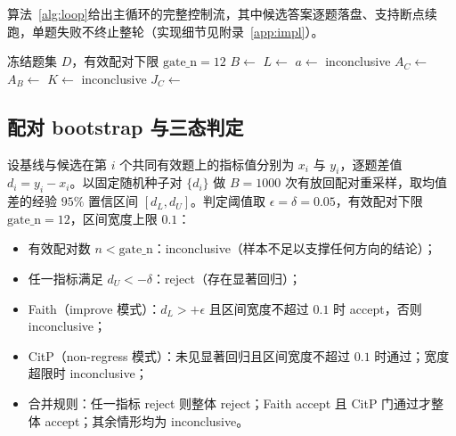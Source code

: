 \documentclass[11pt,a4paper,fontset=fandol]{ctexart}
\begin{document}
算法~\ref{alg:loop}给出主循环的完整控制流，其中候选答案逐题落盘、支持断点续跑，单题失败不终止整轮（实现细节见附录~\ref{app:impl}）。

\begin{algorithm}[H]
\caption{单管线三态比较主循环}\label{alg:loop}
\begin{algorithmic}[1]
\Require 冻结题集 $D$，有效配对下限 $\mathrm{gate\_n}=12$
\State $B\gets$ 
\State $L\gets$ 
\State $a\gets$ 
  \State \Return inconclusive 
\EndIf
\State $A_C\gets$ 
\State $A_B\gets$
\State $K\gets$
  \State \Return inconclusive 
\EndIf
\State $J_C\gets$ 
\State \Return {} 
\end{algorithmic}
\end{algorithm}

\subsection{配对 bootstrap 与三态判定}
\label{sec:decide}

设基线与候选在第 $i$ 个共同有效题上的指标值分别为 $x_i$ 与 $y_i$，逐题差值 $d_i=y_i-x_i$。以固定随机种子对 $\{d_i\}$ 做 $B=1000$ 次有放回配对重采样，取均值差的经验 $95\%$ 置信区间 $[d_L,d_U]$\cite{ares}。判定阈值取 $\epsilon=\delta=0.05$，有效配对下限 $\mathrm{gate\_n}=12$，区间宽度上限 $0.1$：

\begin{itemize}[leftmargin=2.5em]
  \item 有效配对数 $n<\mathrm{gate\_n}$：inconclusive（样本不足以支撑任何方向的结论）；
  \item 任一指标满足 $d_U<-\delta$：reject（存在显著回归）；
  \item Faith（improve 模式）：$d_L>+\epsilon$ 且区间宽度不超过 $0.1$ 时 accept，否则 inconclusive；
  \item CitP（non-regress 模式）：未见显著回归且区间宽度不超过 $0.1$ 时通过；宽度超限时 inconclusive；
  \item 合并规则：任一指标 reject 则整体 reject；Faith accept 且 CitP 门通过才整体 accept；其余情形均为 inconclusive。
\end{itemize}
\end{document}
